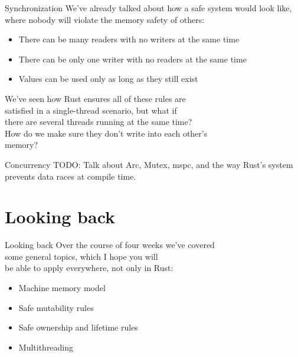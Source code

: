 \documentclass[usenames,dvipsnames,10pt,aspectratio=169]{beamer}
\begin{document}
\begin{frame}{Synchronization}
	\large
	We've already talked about how a safe system would look like,
	where nobody will violate the memory safety of others:
	\vspace{0.4cm}
	\begin{itemize}[label=$\bullet$]
		\item There can be many readers with no writers at the same time
		\item There can be only one writer with no readers at the same time
		\item Values can be used only as long as they still exist
	\end{itemize}
	\vspace{0.4cm}
	We've seen how Rust ensures all of these rules are\\
	satisfied in a single-thread scenario, but what if\\
	there are several threads running at the same time?\\
	How do we make sure they don't write into each other's\\
	memory?
\end{frame}

\begin{frame}{Concurrency}
	\large
	\textcolor{ucured}{TODO: Talk about Arc, Mutex,
	mspc, and the way Rust's system prevents data races at compile
time.}
\end{frame}


\section{Looking back}

\begin{frame}{Looking back}
	\large
	Over the course of four weeks we've covered\\
	some general topics, which I hope you will\\
	be able to apply everywhere, not only in Rust:\\
	\vspace{0.1cm}
\begin{itemize}[label=$\bullet$]
	\item Machine memory model
	\item Safe mutability rules
	\item Safe ownership and lifetime rules
	\item Multithreading
\end{itemize}
	
\end{frame}
\end{document}
